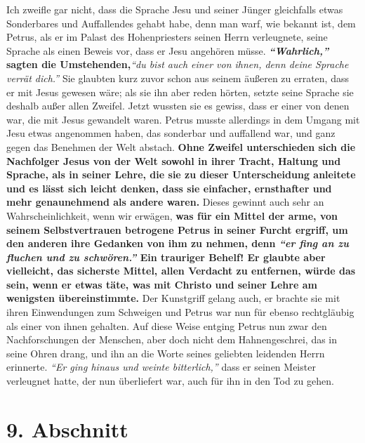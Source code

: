 Ich zweifle gar nicht, dass die Sprache Jesu
und seiner Jünger gleichfalls etwas
Sonderbares und Auffallendes gehabt habe, denn man warf, wie bekannt ist, dem
Petrus, als er im Palast des Hohenpriesters
seinen Herrn verleugnete, seine
Sprache als einen Beweis vor, dass er Jesu angehören müsse.
\textbf{\textit{"`Wahrlich,"'} sagten
die Umstehenden,}\textit{"`du bist auch einer von ihnen, denn deine Sprache
verrät
dich."'}
Sie glaubten kurz zuvor schon aus seinem äußeren
zu erraten, dass er mit Jesus gewesen wäre; als sie ihn aber reden hörten, setzte
seine Sprache sie deshalb außer allen Zweifel. Jetzt wussten sie es gewiss, dass
er
einer von denen war, die mit Jesus gewandelt waren. Petrus musste allerdings in
dem Umgang mit Jesu etwas angenommen haben, das sonderbar und auffallend war,
und ganz gegen das Benehmen der Welt abstach. \label{ref:10_08_sprache}
\textbf{Ohne Zweifel unterschieden sich
die Nachfolger Jesus von der Welt sowohl in ihrer
Tracht, Haltung und Sprache,
als in seiner Lehre, die sie zu dieser Unterscheidung anleitete und es lässt sich
leicht denken, dass sie einfacher,
ernsthafter und mehr genaunehmend als andere
waren.} Dieses gewinnt auch sehr an Wahrscheinlichkeit, wenn wir erwägen,
\textbf{was für
ein Mittel der arme, von seinem Selbstvertrauen betrogene Petrus in seiner
Furcht ergriff, um den anderen ihre Gedanken von ihm zu nehmen, denn
\textit{"`er fing
an zu fluchen und zu schwören."'} Ein trauriger Behelf! Er glaubte aber
vielleicht, das sicherste Mittel, allen Verdacht zu entfernen, würde das sein,
wenn er etwas täte, was mit Christo und seiner Lehre am wenigsten
übereinstimmte.} Der Kunstgriff gelang auch, er brachte sie mit ihren
Einwendungen zum Schweigen und Petrus war nun für ebenso
rechtgläubig als
einer von ihnen gehalten. Auf diese Weise entging Petrus nun zwar den
Nachforschungen der Menschen, aber doch nicht dem Hahnengeschrei, das in seine
Ohren drang, und ihn an die Worte seines geliebten leidenden Herrn erinnerte.
\textit{"`Er ging hinaus und weinte bitterlich,"'} dass er seinen Meister
verleugnet
hatte, der nun überliefert war, auch für ihn in den Tod zu gehen.

\section{9. Abschnitt} \label{kap10_ab9}

